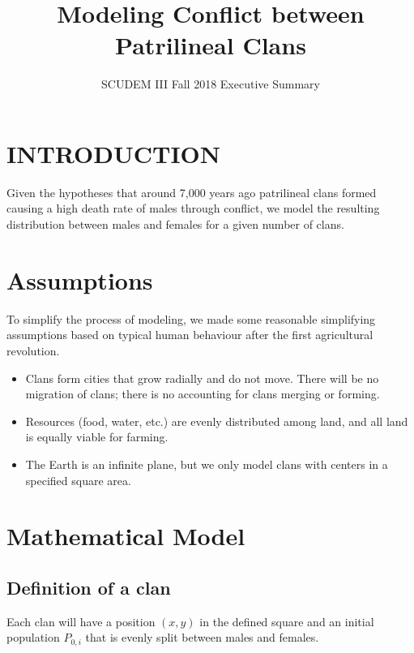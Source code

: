 \documentclass[letterpaper, 9pt, conference]{ieeeconf}  %
\title{\LARGE \bf
Modeling Conflict between Patrilineal Clans
}
\author{SCUDEM III Fall 2018 Executive Summary}
\begin{document}
\maketitle
\thispagestyle{empty}
\pagestyle{empty}

\section{INTRODUCTION}

Given the hypotheses that around 7,000 years ago patrilineal clans formed causing a high death rate of males through conflict, we model the resulting distribution between males and females for a given number of clans\cite{problem}.

\section{Assumptions}

To simplify the process of modeling, we made some reasonable simplifying assumptions based on typical human behaviour after the first agricultural revolution.
\begin{itemize}
    \item Clans form cities that grow radially and do not move. There will be no migration of clans; there is no accounting for clans merging or forming.
    \item Resources (food, water, etc.) are evenly distributed among land, and all land is equally viable for farming. 
    \item The Earth is an infinite plane, but we only model clans with centers in a specified square area.
\end{itemize}

\section{Mathematical Model}

\subsection{Definition of a clan}
Each clan will have a position $(x,y)$ in the defined square and an initial population $P_{0,i}$ that is evenly split between males and females.
\end{document}
